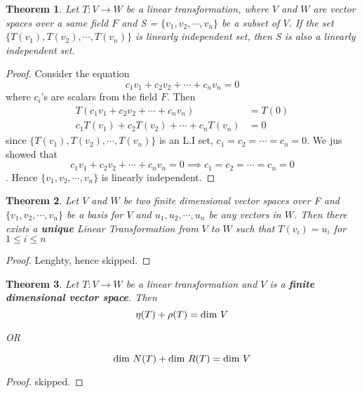 \documentclass[a4paper, titlepage]{article}
\newtheorem{theorem}{Theorem}[section]
\begin{document}
        \begin{theorem}
            Let $T: V \rightarrow W$ be a linear transformation, where
            $V$ and $W$ are vector spaces over a same field $F$ and S =
            $\{v_1, v_2, \cdots, v_n\}$ be a subset of $V$. If the
            set $\{T(v_1), T(v_2), \cdots, T(v_n)\}$ is linearly independent
            set, then S is also a linearly independent set.
        \end{theorem}
        \begin{proof}
            Consider the equation \[ c_1v_1 + c_2v_2 + \cdots + c_nv_n = 0 \]
            where $c_i$'s are scalars from the field $F$. Then 
            \begin{align*}
                T(c_1v_1 + c_2v_2 + \cdots + c_nv_n) &= T(0) \\
                c_1T(v_1) + c_2T(v_2) + \cdots + c_nT(v_n) &= 0 
            \end{align*}
            since $\{T(v_1), T(v_2), \cdots, T(v_n)\}$ is an L.I set,
            $c_1 = c_2 = \cdots = c_n = 0$. We jus showed that 
            $$c_1v_1 + c_2v_2 + \cdots + c_nv_n = 0 \implies c_1 = c_2 = 
            \cdots = c_n = 0$$. Hence $\{ v_1, v_2, \cdots, v_n \}$ is
            linearly independent.
        \end{proof}
        \begin{theorem}
            Let $V$ and $W$ be two finite dimensional vector spaces over F
            and $\{ v_1, v_2, \cdots, v_n \}$ be a basis for $V$ and 
            $u_1, u_2, \cdots, u_n$ be any vectors in $W$. Then there 
            exists a \textbf{unique} Linear Transformation from $V$ to 
            $W$ such that $T(v_i) = u_i$ for $1 \le i \le n$
        \end{theorem}
        \begin{proof}
            Lenghty, hence skipped.
        \end{proof}
        \begin{theorem}
            Let $T: V \rightarrow W$ be a linear transformation and $V$
            is a \textbf{finite dimensional vector space}. Then 
            \[ \eta(T) + \rho(T) = \textup{dim }V \]
            \begin{center}
                OR
            \end{center}
            \[ \textup{dim }N(T) + \textup{dim }R(T) = \textup{dim }V \]
        \end{theorem}
        \begin{proof}
            skipped.
        \end{proof}
\end{document}
